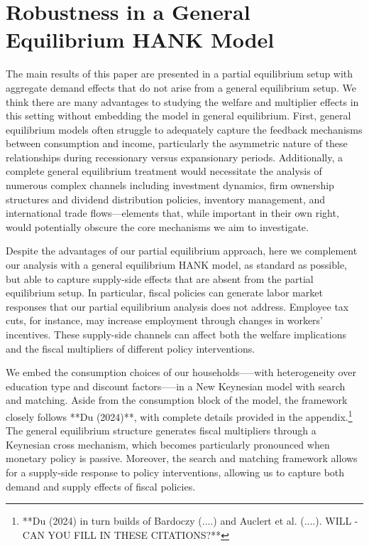 \documentclass[\econtexRoot/HAFiscal]{subfiles}
\begin{document}
	
\FloatBarrier
\hypertarget{hank}{}\par\section{Robustness in a General Equilibrium HANK Model}
\notinsubfile{\label{sec:hank}}


The main results of this paper are presented in a partial equilibrium setup with aggregate demand effects that do not arise from a general equilibrium setup. We think there are many advantages to studying the welfare and multiplier effects in this setting without embedding the model in general equilibrium.  First, general equilibrium models often struggle to adequately capture the feedback mechanisms between consumption and income, particularly the asymmetric nature of these relationships during recessionary versus expansionary periods. Additionally, a complete general equilibrium treatment would necessitate the analysis of numerous complex channels including investment dynamics, firm ownership structures and dividend distribution policies, inventory management, and international trade flows—elements that, while important in their own right, would potentially obscure the core mechanisms we aim to investigate.



Despite the advantages of our partial equilibrium approach, here we complement our analysis with a  general equilibrium HANK model, as standard as possible, but able to capture supply-side effects that are absent from the partial equilibrium setup. In particular, fiscal policies can generate labor market responses that our partial equilibrium analysis does not address. Employee tax cuts, for instance, may increase employment through changes in workers' incentives. These supply-side channels can affect both the welfare implications and the fiscal multipliers of different policy interventions.



We embed the consumption choices of our households—--with heterogeneity over education type and discount factors—--in a New Keynesian model with search and matching. Aside from the consumption block of the model, the framework closely follows **Du (2024)**, with complete details provided in the appendix.\footnote{**Du (2024) in turn builds of Bardoczy (....) and Auclert et al. (....). WILL - CAN YOU FILL IN THESE CITATIONS?**} The general equilibrium structure generates fiscal multipliers through a Keynesian cross mechanism, which becomes particularly pronounced when monetary policy is passive. Moreover, the search and matching framework allows for a supply-side response to policy interventions, allowing us to capture both demand and supply effects of fiscal policies.
\end{document}
